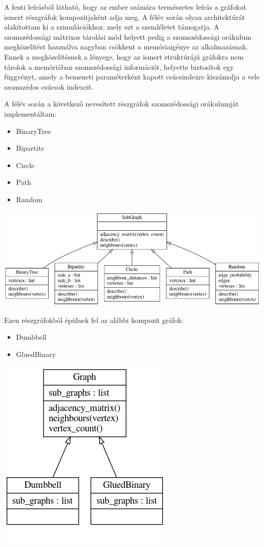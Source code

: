 A fenti leírásból látható, hogy az ember számára természetes leírás a gráfokat
ismert részgráfok kompozitjaként adja meg. A félév során olyan architektúrát
alakítottam ki a szimulációkhoz, mely ezt a szemléletet támogatja. A szomszédossági
mátrixos tárolási mód helyett pedig a szomszédossági orákulum megközelítést
használva nagyban csökkent a memóriaigénye az alkalmazásnak. Ennek a megközelítésnek
a lényege, hogy az ismert struktúrájú gráfokra nem tárolok a memóriában
szomszédossági információt, helyette biztosítok egy függvényt, amely a bemeneti
paraméterként kapott csúcsindexre kiszámolja a vele szomszédos csúcsok indexeit.

A félév során a következő nevesített részgráfok szomszédossági orákulumját implementáltam:
\begin{itemize}
  \item BinaryTree
  \item Bipartite
  \item Circle
  \item Path
  \item Random
\end{itemize}

\begin{center}
  \includegraphics[width=\linewidth]{./figures/subgraph.png}
\end{center}

Ezen részgráfokból épülnek fel az alábbi kompozit gráfok:
\begin{itemize}
  \item Dumbbell
  \item GluedBinary
\end{itemize}

\begin{center}
  \includegraphics[width=0.4\linewidth]{./figures/graph.png}
\end{center}

